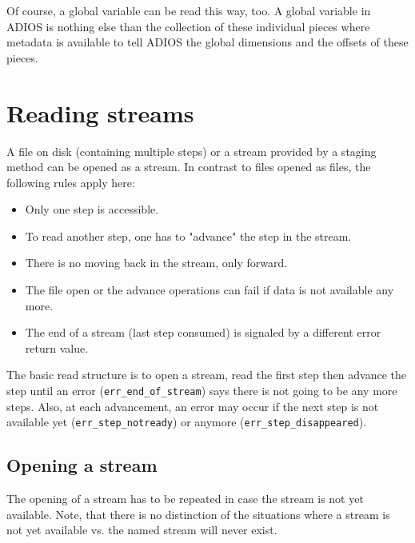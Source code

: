 \noindent Of course, a global variable can be read this way, too. A global variable in ADIOS is nothing else than the collection of these individual pieces where metadata is available to tell ADIOS the global dimensions and the offsets of these pieces.





\section{Reading streams}
A file on disk (containing multiple steps) or a stream provided by a staging method can be opened as a stream. In contrast to files opened as files, the following rules apply here:

  \begin{itemize}
  \item Only one step is accessible.
  \item To read another step, one has to "advance" the step in the stream.
  \item There is no moving back in the stream, only forward.
  \item The file open or the advance operations can fail if data is not available any more.
  \item The end of a stream (last step consumed) is signaled by a different error return value.
  \end{itemize}

The basic read structure is to open a stream, read the first step then advance the step until an error (\verb+err_end_of_stream+) says there is not going to be any more steps. Also, at each advancement, an error may occur if the next step is not available yet (\verb+err_step_notready+) or anymore (\verb+err_step_disappeared+).


\subsection{Opening a stream}
The opening of a stream has to be repeated in case the stream is not yet available. Note, that there is no distinction of the situations where a stream is not yet available vs. the named stream will never exist.

